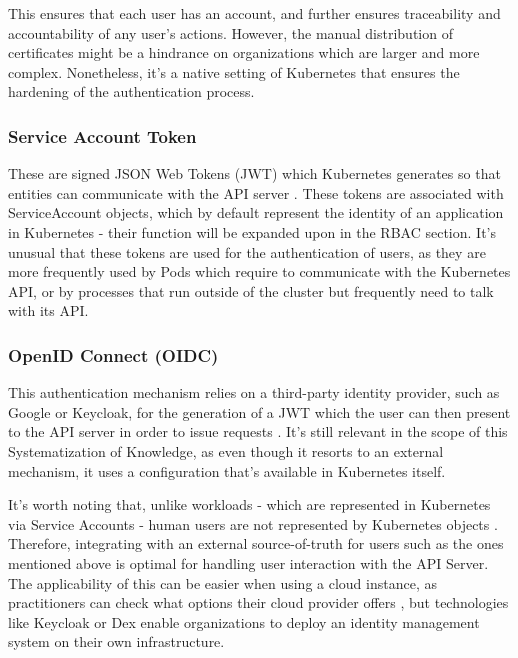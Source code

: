 \documentclass[a4paper,11pt,openright,BCOR=15mm]{scrbook}
\begin{document}
This ensures that each user has an account, and further ensures traceability and accountability of any user's actions. However, the manual distribution of certificates might be a hindrance on organizations which are larger and more complex. Nonetheless, it's a native setting of Kubernetes that ensures the hardening of the authentication process. 

\subsubsection{Service Account Token}

These are signed JSON Web Tokens (JWT) which Kubernetes generates so that entities can communicate with the API server \cite{the_linux_foundation_authenticating_2024}. These tokens are associated with ServiceAccount objects, which by default represent the identity of an application in Kubernetes \cite{martin_hacking_2021} - their function will be expanded upon in the RBAC section. It's unusual that these tokens are used for the authentication of users, as they are more frequently used by Pods which require to communicate with the Kubernetes API, or by processes that run outside of the cluster but frequently need to talk with its API.

\subsubsection{OpenID Connect (OIDC)}

This authentication mechanism relies on a third-party identity provider, such as Google or Keycloak, for the generation of a JWT which the user can then present to the API server in order to issue requests \cite{the_linux_foundation_authenticating_2024}. It's still relevant in the scope of this Systematization of Knowledge, as even though it resorts to an external mechanism, it uses a configuration that's available in Kubernetes itself.

It's worth noting that, unlike workloads - which are represented in Kubernetes via Service Accounts - human users are not represented by Kubernetes objects \cite{the_linux_foundation_authenticating_2024,martin_hacking_2021}. Therefore, integrating with an external source-of-truth for users such as the ones mentioned above is optimal for handling user interaction with the API Server. The applicability of this can be easier when using a cloud instance, as practitioners can check what options their cloud provider offers \cite{martin_hacking_2021}, but technologies like Keycloak or Dex enable organizations to deploy an identity management system on their own infrastructure.
\end{document}
